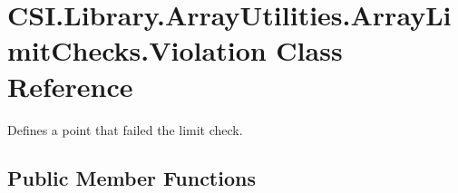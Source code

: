 \hypertarget{class_c_s_i_1_1_library_1_1_array_utilities_1_1_array_limit_checks_1_1_violation}{}\section{C\+S\+I.\+Library.\+Array\+Utilities.\+Array\+Limit\+Checks.\+Violation Class Reference}
\label{class_c_s_i_1_1_library_1_1_array_utilities_1_1_array_limit_checks_1_1_violation}


Defines a point that failed the limit check.  


\subsection*{Public Member Functions}
